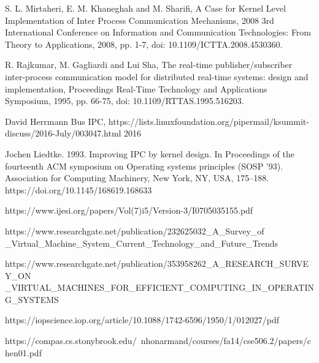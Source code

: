 \documentclass[12pt]{report}
\begin{document}
 
	\pagebreak
	\begin{thebibliography}{9}
		S. L. Mirtaheri, E. M. Khaneghah and M. Sharifi, 
		A Case for Kernel Level Implementation of Inter Process Communication Mechanisms,
		2008 3rd International Conference on Information and Communication Technologies: From Theory to Applications, 
		2008, pp. 1-7, doi: 10.1109/ICTTA.2008.4530360.
	
		R. Rajkumar, M. Gagliardi and Lui Sha, 
		The real-time publisher/subscriber inter-process communication model for distributed real-time systems: design and implementation, 
		Proceedings Real-Time Technology and Applications Symposium, 
		1995, pp. 66-75, doi: 10.1109/RTTAS.1995.516203. 

		David Herrmann
		Bus IPC, https://lists.linuxfoundation.org/pipermail/ksummit-discuss/2016-July/003047.html
		2016
		
		Jochen Liedtke. 1993. 
		Improving IPC by kernel design. In Proceedings of the fourteenth ACM symposium on Operating systems principles (SOSP '93). 
		Association for Computing Machinery, 
		New York, NY, USA, 175–188. 
		https://doi.org/10.1145/168619.168633

        https://www.ijesi.org/papers/Vol(7)i5/Version-3/I0705035155.pdf

        https://www.researchgate.net/publication/232625032\_A\_Survey\_of
        \_Virtual\_Machine\_System\_Current\_Technology\_and\_Future\_Trends

    https://www.researchgate.net/publication/353958262\_A\_RESEARCH\_SURVEY\_ON
    \_VIRTUAL\_MACHINES\_FOR\_EFFICIENT\_COMPUTING\_IN\_OPERATING\_SYSTEMS

    https://iopscience.iop.org/article/10.1088/1742-6596/1950/1/012027/pdf
 
    https://compas.cs.stonybrook.edu/~nhonarmand/courses/fa14/cse506.2/papers/chen01.pdf

	\end{thebibliography}
\end{document}
